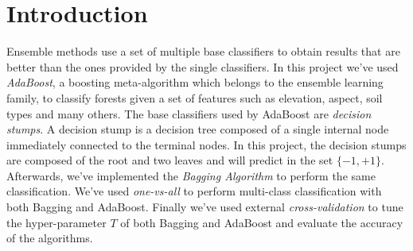 \chapter{Introduction}
Ensemble methods use a set of multiple base classifiers to obtain results that are better than the ones provided by the single classifiers. In this project we've used \textit{AdaBoost}, a boosting meta-algorithm which belongs to the ensemble learning family, to classify forests given a set of features such as elevation, aspect, soil types and many others. The base classifiers used by AdaBoost are \textit{decision stumps}. A decision stump is a decision tree composed of a single internal node immediately connected to the terminal nodes. In this project, the decision stumps are composed of the root and two leaves and will predict in the set $\lbrace-1, +1\rbrace$. Afterwards, we've implemented the \textit{Bagging Algorithm} to perform the same classification. We've used \textit{one-vs-all} to perform multi-class classification with both Bagging and AdaBoost. Finally we've used external \textit{cross-validation} to tune the hyper-parameter $T$ of both Bagging and AdaBoost and evaluate the accuracy of the algorithms.

